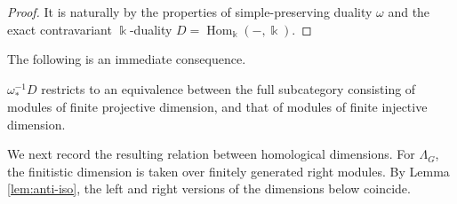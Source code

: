 \documentclass[a4paper,leqno]{amsart}
\begin{document}
\begin{proof}
It is naturally by the properties of simple-preserving duality $\omega$ and the exact contravariant $\Bbbk$-duality $D=\operatorname{Hom}_{\Bbbk}(-,\Bbbk)$.
\end{proof}

The following is an immediate consequence.
\begin{cor}\label{cor:fdim symmetry}
    $\omega_*^{-1}D$ restricts to an equivalence between the full subcategory consisting of modules of finite projective dimension, and that of modules of finite injective dimension.
\end{cor}

We next record the resulting relation between homological dimensions.
For $\Lambda_G$, the finitistic dimension is taken over finitely
generated right modules.  By Lemma \ref{lem:anti-iso}, the left and right versions of the dimensions below coincide.
\end{document}

